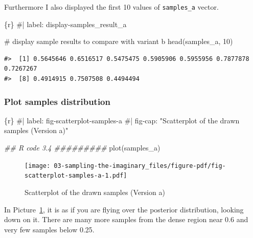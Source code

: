 \documentclass[
  letterpaper,
  DIV=11,
  numbers=noendperiod]{scrreprt}
\newenvironment{Shaded}{\begin{snugshade}}{\end{snugshade}}
\newcommand{\CommentTok}[1]{\textcolor[rgb]{0.37,0.37,0.37}{#1}}
\newcommand{\DecValTok}[1]{\textcolor[rgb]{0.68,0.00,0.00}{#1}}
\newcommand{\DocumentationTok}[1]{\textcolor[rgb]{0.37,0.37,0.37}{\textit{#1}}}
\newcommand{\FunctionTok}[1]{\textcolor[rgb]{0.28,0.35,0.67}{#1}}
\newcommand{\InformationTok}[1]{\textcolor[rgb]{0.37,0.37,0.37}{#1}}
\newcommand{\NormalTok}[1]{\textcolor[rgb]{0.00,0.23,0.31}{#1}}
\begin{document}
Furthermore I also displayed the first 10 values of \texttt{samples\_a}
vector.

\begin{Shaded}
\begin{Highlighting}[]
\InformationTok{\textasciigrave{}\textasciigrave{}\textasciigrave{}\{r\}}
\CommentTok{\#| label: display{-}samples\_result\_a}

\CommentTok{\# display sample results to compare with variant b}
\FunctionTok{head}\NormalTok{(samples\_a, }\DecValTok{10}\NormalTok{)}
\InformationTok{\textasciigrave{}\textasciigrave{}\textasciigrave{}}
\end{Highlighting}
\end{Shaded}

\begin{verbatim}
#>  [1] 0.5645646 0.6516517 0.5475475 0.5905906 0.5955956 0.7877878 0.7267267
#>  [8] 0.4914915 0.7507508 0.4494494
\end{verbatim}

\hypertarget{plot-samples-distribution}{%
\subsubsection{Plot samples
distribution}\label{plot-samples-distribution}}

\begin{Shaded}
\begin{Highlighting}[]
\InformationTok{\textasciigrave{}\textasciigrave{}\textasciigrave{}\{r\}}
\CommentTok{\#| label: fig{-}scatterplot{-}samples{-}a}
\CommentTok{\#| fig{-}cap: "Scatterplot of the drawn samples (Version a)"}

\DocumentationTok{\#\# R code 3.4 \#\#\#\#\#\#\#\#\#}
\FunctionTok{plot}\NormalTok{(samples\_a)}
\InformationTok{\textasciigrave{}\textasciigrave{}\textasciigrave{}}
\end{Highlighting}
\end{Shaded}

\begin{figure}[H]

{\centering \texttt{[image: 03-sampling-the-imaginary\_files/figure-pdf/fig-scatterplot-samples-a-1.pdf]}

}

\caption{\label{fig-scatterplot-samples-a}Scatterplot of the drawn
samples (Version a)}

\end{figure}

In Picture~\ref{fig-scatterplot-samples-a}, it is as if you are flying
over the posterior distribution, looking down on it. There are many more
samples from the dense region near 0.6 and very few samples below 0.25.
\end{document}
